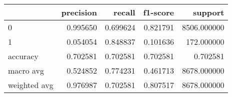 \begin{tabular}{lrrrr}
\toprule
{} &  precision &    recall &  f1-score &      support \\
\midrule
0            &   0.995650 &  0.699624 &  0.821791 &  8506.000000 \\
1            &   0.054054 &  0.848837 &  0.101636 &   172.000000 \\
accuracy     &   0.702581 &  0.702581 &  0.702581 &     0.702581 \\
macro avg    &   0.524852 &  0.774231 &  0.461713 &  8678.000000 \\
weighted avg &   0.976987 &  0.702581 &  0.807517 &  8678.000000 \\
\bottomrule
\end{tabular}

